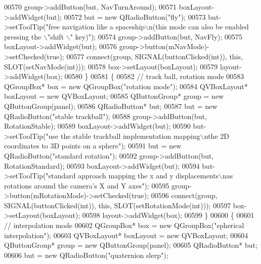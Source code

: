 \begin{DoxyCode}
00570     group->addButton(but, NavTurnAround);
00571     boxLayout->addWidget(but);
00572     but = \textcolor{keyword}{new} QRadioButton(\textcolor{stringliteral}{"fly"});
00573     but->setToolTip(\textcolor{stringliteral}{"free navigation like a spaceship\(\backslash\)n(this mode can also be enabled pressing the \(\backslash\)"shift
      \(\backslash\)" key)"});
00574     group->addButton(but, NavFly);
00575     boxLayout->addWidget(but);
00576     group->button(mNavMode)->setChecked(\textcolor{keyword}{true});
00577     connect(group, SIGNAL(buttonClicked(\textcolor{keywordtype}{int})), \textcolor{keyword}{this}, SLOT(setNavMode(\textcolor{keywordtype}{int})));
00578     box->setLayout(boxLayout);
00579     layout->addWidget(box);
00580   \}
00581   \{
00582     \textcolor{comment}{// track ball, rotation mode}
00583     QGroupBox* box = \textcolor{keyword}{new} QGroupBox(\textcolor{stringliteral}{"rotation mode"});
00584     QVBoxLayout* boxLayout = \textcolor{keyword}{new} QVBoxLayout;
00585     QButtonGroup* group = \textcolor{keyword}{new} QButtonGroup(panel);
00586     QRadioButton* but;
00587     but = \textcolor{keyword}{new} QRadioButton(\textcolor{stringliteral}{"stable trackball"});
00588     group->addButton(but, RotationStable);
00589     boxLayout->addWidget(but);
00590     but->setToolTip(\textcolor{stringliteral}{"use the stable trackball implementation mapping\(\backslash\)nthe 2D coordinates to 3D points on a
       sphere"});
00591     but = \textcolor{keyword}{new} QRadioButton(\textcolor{stringliteral}{"standard rotation"});
00592     group->addButton(but, RotationStandard);
00593     boxLayout->addWidget(but);
00594     but->setToolTip(\textcolor{stringliteral}{"standard approach mapping the x and y displacements\(\backslash\)nas rotations around the camera's
       X and Y axes"});
00595     group->button(mRotationMode)->setChecked(\textcolor{keyword}{true});
00596     connect(group, SIGNAL(buttonClicked(\textcolor{keywordtype}{int})), \textcolor{keyword}{this}, SLOT(setRotationMode(\textcolor{keywordtype}{int})));
00597     box->setLayout(boxLayout);
00598     layout->addWidget(box);
00599   \}
00600   \{
00601     \textcolor{comment}{// interpolation mode}
00602     QGroupBox* box = \textcolor{keyword}{new} QGroupBox(\textcolor{stringliteral}{"spherical interpolation"});
00603     QVBoxLayout* boxLayout = \textcolor{keyword}{new} QVBoxLayout;
00604     QButtonGroup* group = \textcolor{keyword}{new} QButtonGroup(panel);
00605     QRadioButton* but;
00606     but = \textcolor{keyword}{new} QRadioButton(\textcolor{stringliteral}{"quaternion slerp"});

\end{DoxyCode}
